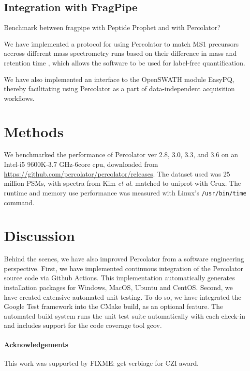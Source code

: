 \documentclass{article}
\newcommand{\fixme}[1]{\color{red}FIXME: #1\color{black}}
\begin{document}
\subsection{Integration with FragPipe}

Benchmark between fragpipe with Peptide Prophet and with Percolator?

We have implemented a protocol for using Percolator to match MS1 precursors accross different mass spectrometry runs based on their difference in mass and retention time \cite{the:focus}, which allows the software to be used for label-free quantification.

We have also implemented an interface to the OpenSWATH module EasyPQ, thereby facilitating using Percolator as a part of data-independent acquisition
workflows.

\section*{Methods}

We benchmarked the performance of Percolator ver 2.8, 3.0, 3.3, and 3.6 on an Intel-i5 9600K-3.7 GHz-6core cpu, downloaded from \url{https://github.com/percolator/percolator/releases}. The dataset used was 25 million PSMs, with spectra from Kim {\em et al.}\cite{kim2014draft} matched to uniprot with Crux\cite{park2008rapid}.
The runtime and memory use performance was measured with Linux's {\tt /usr/bin/time} command. 

\section*{Discussion}

Behind the scenes, we have also improved Percolator from a software engineering perspective.
First, we have implemented continuous integration of the Percolator source code via Github Actions.
This implementation automatically generates installation packages for Windows, MacOS, Ubuntu and CentOS.
Second, we have created extensive automated unit testing.
To do so, we have integrated the Google Test framework into the CMake build, as an optional feature.
The automated build system runs the unit test suite automatically with each check-in and includes support for the code coverage tool gcov.

\paragraph{Acknowledgements}

This work was supported by \fixme{get verbiage for CZI award.}



\end{document}
